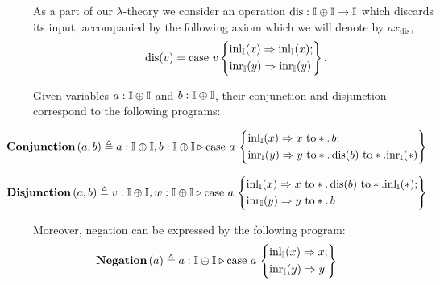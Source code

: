 As a part of our $\lambda$-theory we consider an operation $\text{dis}: \mathbb{I} \oplus \mathbb{I} \to \mathbb{I}$ which discards its input, accompanied by the following axiom which we will denote by $ax_\text{dis}$,
\[\text{dis}(v) = \text{case } v \left\{
    \begin{aligned} 
    &\mathrm{inl}_{\mathbb{I}}(x) \Rightarrow \mathrm{inl}_{\mathbb{I}}(x) ; \\
    &\mathrm{inr}_{\mathbb{I}}(y) \Rightarrow  \mathrm{inr}_{\mathbb{I}}(y)  \\ 
  \end{aligned}  
  \right\} . \]

Given variables $a : \mathbb{I} \oplus \mathbb{I}$ and $b : \mathbb{I} \oplus \mathbb{I}$, their conjunction and disjunction correspond to the following programs:

\begin{align*}
  & \hspace{-25pt}\textbf{Conjunction}\,(a,b) \triangleq a:\typeI \oplus \typeI, b:\typeI \oplus \typeI \vljud \text{case } a\,
\left\{
    \begin{aligned} 
    &\inl_{\typeI}(x) \Rightarrow x \text{ to} *. \, b ; \\
    &\inr_{\typeI}(y) \Rightarrow y  \text{ to} *. \,  \text{dis}(b) \text{ to} *. \inr_{\typeI}(*)  \\ 
  \end{aligned}  
  \right\}
\end{align*}

\begin{align*}
  & \hspace{-25pt}\textbf{Disjunction}\,(a,b) \triangleq v:\typeI \oplus \typeI, w:\typeI \oplus \typeI \vljud \text{case } a\,
\left\{
    \begin{aligned} 
    &\inl_{\typeI}(x) \Rightarrow  x\text{ to} *. \,  \text{dis}(b) \text{ to} *. \inl_{\typeI}(*) ; \\
    &\inr_{\typeI}(y) \Rightarrow  y \text{ to} *. \,  b  \\ 
  \end{aligned}  
  \right\}
\end{align*}

Moreover, negation can be expressed by the following program:
  \begin{align*}
  & \hspace{-25pt}\textbf{Negation}\,(a) \triangleq a:\typeI \oplus \typeI \vljud \text{case } a\,
\left\{
    \begin{aligned} 
    &\inl_{\typeI}(x) \Rightarrow x ; \\
    &\inr_{\typeI}(y) \Rightarrow  y  \\ 
  \end{aligned}  
  \right\}
\end{align*}

